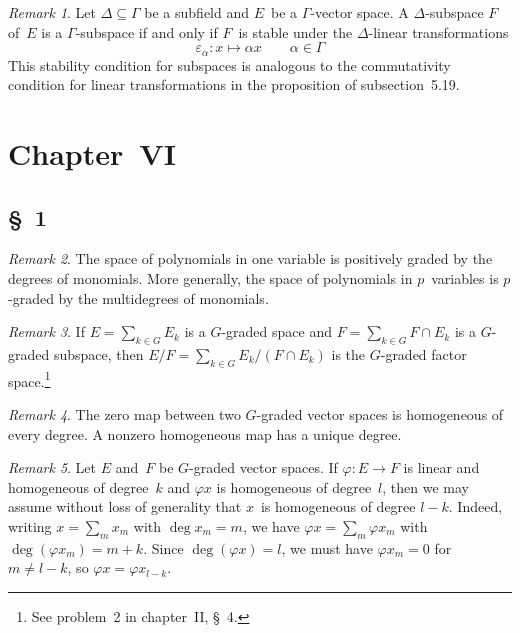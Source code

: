 \documentclass[letterpaper,12pt]{article}
\newcommand{\sect}{\cap}
\theoremstyle{definition}
\theoremstyle{remark}
\newtheorem*{rmk}{Remark}
\begin{document}
\begin{rmk}
Let \(\Delta\subseteq\Gamma\) be a subfield and \(E\)~be a \(\Gamma\)-vector space. A \(\Delta\)-subspace \(F\) of~\(E\) is a \(\Gamma\)-subspace if and only if \(F\)~is stable under the \(\Delta\)-linear transformations
\[\varepsilon_{\alpha}:x\mapsto\alpha x\qquad\alpha\in\Gamma\]
This stability condition for subspaces is analogous to the commutativity condition for linear transformations in the proposition of subsection~5.19.
\end{rmk}

\section*{Chapter~VI}
\subsection*{\S~1}
\begin{rmk}
The space of polynomials in one variable is positively graded by the degrees of monomials. More generally, the space of polynomials in \(p\)~variables is \(p\)-graded by the multidegrees of monomials.
\end{rmk}

\begin{rmk}
If \(E=\sum_{k\in G}E_k\) is a \(G\)-graded space and \(F=\sum_{k\in G}F\sect E_k\) is a \(G\)-graded subspace, then \(E/F=\sum_{k\in G}E_k/(F\sect E_k)\) is the \(G\)-graded factor space.\footnote{See problem~2 in chapter~II, \S~4.}
\end{rmk}

\begin{rmk}
The zero map between two \(G\)-graded vector spaces is homogeneous of every degree. A nonzero homogeneous map has a unique degree.
\end{rmk}

\begin{rmk}
Let \(E\) and~\(F\) be \(G\)-graded vector spaces. If \(\varphi:E\to F\) is linear and homogeneous of degree~\(k\) and \(\varphi x\) is homogeneous of degree~\(l\), then we may assume without loss of generality that \(x\)~is homogeneous of degree \(l-k\). Indeed, writing \(x=\sum_m x_m\) with \(\deg x_m=m\), we have \(\varphi x=\sum_m\varphi x_m\) with \(\deg(\varphi x_m)=m+k\). Since \(\deg(\varphi x)=l\), we must have \(\varphi x_m=0\) for \(m\ne l-k\), so \(\varphi x=\varphi x_{l-k}\).
\end{rmk}
\end{document}

